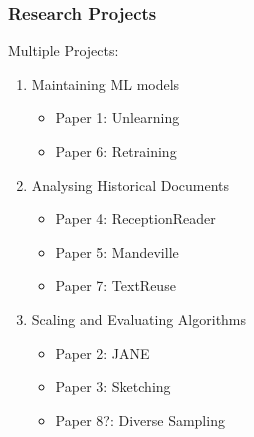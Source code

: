 \documentclass[pdf]{beamer}
\begin{document}
\begin{frame}
    \frametitle{Research Projects}

    Multiple Projects:
    \begin{enumerate}
        \item Maintaining ML models
        \begin{itemize}
            \item Paper 1: Unlearning 
            \item Paper 6: Retraining
        \end{itemize}
        \item Analysing Historical Documents 
        \begin{itemize}
            \item Paper 4: ReceptionReader
            \item Paper 5: Mandeville
            \item Paper 7: TextReuse
        \end{itemize}
        \item Scaling and Evaluating Algorithms
        \begin{itemize}
            \item Paper 2: JANE
            \item Paper 3: Sketching 
            \item Paper 8?: Diverse Sampling 
        \end{itemize}
    \end{enumerate}

\end{frame}
\end{document}
